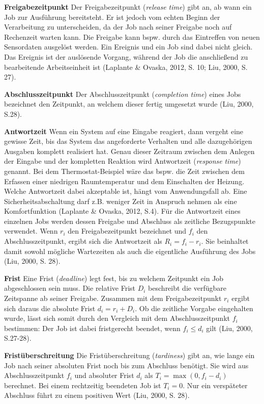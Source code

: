 \textbf{Freigabezeitpunkt }Der Freigabezeitpunkt (\emph{release} \emph{time}) gibt an, ab wann ein Job zur Ausf{\"u}hrung bereitsteht. Er ist jedoch vom echten Beginn der Verarbeitung zu unterscheiden, da der Job nach seiner Freigabe noch auf Rechenzeit warten kann. Die Freigabe kann bspw. durch das Eintreffen von neuen Sensordaten ausgel{\"o}st werden. Ein Ereignis und ein Job sind dabei nicht gleich. Das Ereignis ist der ausl{\"o}sende Vorgang, w{\"a}hrend der Job die anschlie{\ss}end zu bearbeitende Arbeitseinheit ist (Laplante \& Ovaska, 2012, S. 10; Liu, 2000, S. 27).

\textbf{Abschlusszeitpunkt }Der Abschlusszeitpunkt (\emph{completion time}) eines Jobs bezeichnet den Zeitpunkt, an welchem dieser fertig umgesetzt wurde (Liu, 2000, S.28).

\textbf{Antwortzeit} Wenn ein System auf eine Eingabe reagiert, dann vergeht eine gewisse Zeit, bis das System das angeforderte Verhalten und alle dazugeh{\"o}rigen Ausgaben komplett realisiert hat. Genau dieser Zeitraum zwischen dem Anlegen der Eingabe und der kompletten Reaktion wird Antwortzeit (\emph{response} \emph{time}) genannt. Bei dem Thermostat-Beispiel w{\"a}re das bspw. die Zeit zwischen dem Erfassen einer niedrigen Raumtemperatur und dem Einschalten der Heizung. Welche Antwortzeit dabei akzeptable ist, h{\"a}ngt vom Anwendungsfall ab. Eine Sicherheitsabschaltung darf z.B. weniger Zeit in Anspruch nehmen als eine Komfortfunktion (Laplante \& Ovaska, 2012, S.4). F{\"u}r die Antwortzeit eines einzelnen Jobs werden dessen Freigabe und Abschluss als zeitliche Bezugspunkte verwendet. Wenn \(r_i\) den Freigabezeitpunkt bezeichnet und \(f_i\) den Abschlusszeitpunkt, ergibt sich die Antwortzeit als \(R_i = f_i - r_i\). Sie beinhaltet damit sowohl m{\"o}gliche Wartezeiten als auch die eigentliche Ausf{\"u}hrung des Jobs (Liu, 2000, S. 28).

\textbf{Frist }Eine Frist (\emph{deadline}) legt fest, bis zu welchem Zeitpunkt ein Job abgeschlossen sein muss. Die relative Frist \(D_i\) beschreibt die verf{\"u}gbare Zeitspanne ab seiner Freigabe. Zusammen mit dem Freigabezeitpunkt \(r_i\) ergibt sich daraus die absolute Frist \(d_i = r_i + D_i\). Ob die zeitliche Vorgabe eingehalten wurde, l{\"a}sst sich somit durch den Vergleich mit dem Abschlusszeitpunkt \(f_i\) bestimmen: Der Job ist dabei fristgerecht beendet, wenn \(f_i \leq d_i\) gilt (Liu, 2000, S.27-28).

\textbf{Frist{\"u}berschreitung }Die Frist{\"u}berschreitung (\emph{tardiness}) gibt an, wie lange ein Job nach seiner absoluten Frist noch bis zum Abschluss ben{\"o}tigt. Sie wird aus Abschlusszeitpunkt \(f_i\) und absoluter Frist \(d_i\) als \(T_i = \max(0, f_i - d_i)\) berechnet. Bei einem rechtzeitig beendeten Job ist \(T_i = 0\). Nur ein versp{\"a}teter Abschluss f{\"u}hrt zu einem positiven Wert (Liu, 2000, S. 28).

